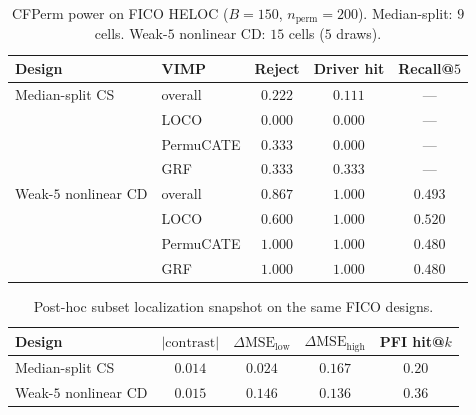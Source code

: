 
\begin{table}[t]
\centering
\caption{CFPerm power on FICO HELOC ($B=150$, $n_{\mathrm{perm}}=200$).
Median-split: $9$ cells. Weak-$5$ nonlinear CD: $15$ cells ($5$ draws).}
\label{tab:fico-cfperm-power}
\begin{tabular}{llccc}
\toprule
Design & VIMP & Reject & Driver hit & Recall@$5$ \\
\midrule
Median-split CS & overall & $0.222$ & $0.111$ & --- \\
 & LOCO & $0.000$ & $0.000$ & --- \\
 & PermuCATE & $0.333$ & $0.000$ & --- \\
 & GRF & $0.333$ & $0.333$ & --- \\
\midrule
Weak-$5$ nonlinear CD & overall & $0.867$ & $1.000$ & $0.493$ \\
 & LOCO & $0.600$ & $1.000$ & $0.520$ \\
 & PermuCATE & $1.000$ & $1.000$ & $0.480$ \\
 & GRF & $1.000$ & $1.000$ & $0.480$ \\
\bottomrule
\end{tabular}
\end{table}

\begin{table}[t]
\centering
\caption{Post-hoc subset localization snapshot on the same FICO designs.}
\label{tab:fico-subset}
\begin{tabular}{lcccc}
\toprule
Design & $|\mathrm{contrast}|$ & $\Delta\mathrm{MSE}_{\mathrm{low}}$ & $\Delta\mathrm{MSE}_{\mathrm{high}}$ & PFI hit@$k$ \\
\midrule
Median-split CS & $0.014$ & $0.024$ & $0.167$ & $0.20$ \\
Weak-$5$ nonlinear CD & $0.015$ & $0.146$ & $0.136$ & $0.36$ \\
\bottomrule
\end{tabular}
\end{table}
